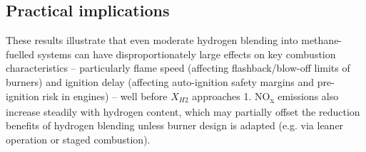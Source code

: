 \documentclass[11pt,a4paper]{article}
\begin{document}
\subsection*{Practical implications}

These results illustrate that even moderate hydrogen blending into methane-fuelled systems can have
disproportionately large effects on key combustion characteristics -- particularly flame speed (affecting
flashback/blow-off limits of burners) and ignition delay (affecting auto-ignition safety margins and pre-ignition
risk in engines) -- well before $X_{H2}$ approaches 1. NO\textsubscript{x} emissions also increase steadily with hydrogen
content, which may partially offset the  reduction benefits of hydrogen blending unless burner design is
adapted (e.g. via leaner operation or staged combustion).

\newpage


\end{document}
